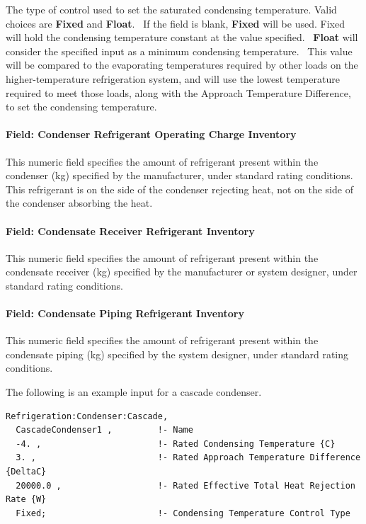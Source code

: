 The type of control used to set the saturated condensing temperature. Valid choices are \textbf{Fixed} and \textbf{Float}.~ If the field is blank, \textbf{Fixed} will be used. Fixed will hold the condensing temperature constant at the value specified.~ \textbf{Float} will consider the specified input as a minimum condensing temperature.~ This value will be compared to the evaporating temperatures required by other loads on the higher-temperature refrigeration system, and will use the lowest temperature required to meet those loads, along with the Approach Temperature Difference, to set the condensing temperature.

\paragraph{Field: Condenser Refrigerant Operating Charge Inventory}\label{field-condenser-refrigerant-operating-charge-inventory-3}

This numeric field specifies the amount of refrigerant present within the condenser (kg) specified by the manufacturer, under standard rating conditions. This refrigerant is on the side of the condenser rejecting heat, not on the side of the condenser absorbing the heat.

\paragraph{Field: Condensate Receiver Refrigerant Inventory}\label{field-condensate-receiver-refrigerant-inventory-3}

This numeric field specifies the amount of refrigerant present within the condensate receiver (kg) specified by the manufacturer or system designer, under standard rating conditions.

\paragraph{Field: Condensate Piping Refrigerant Inventory}\label{field-condensate-piping-refrigerant-inventory-3}

This numeric field specifies the amount of refrigerant present within the condensate piping (kg) specified by the system designer, under standard rating conditions.

The following is an example input for a cascade condenser.

\begin{lstlisting}
Refrigeration:Condenser:Cascade,
  CascadeCondenser1 ,         !- Name
  -4. ,                       !- Rated Condensing Temperature {C}
  3. ,                        !- Rated Approach Temperature Difference {DeltaC}
  20000.0 ,                   !- Rated Effective Total Heat Rejection Rate {W}
  Fixed;                      !- Condensing Temperature Control Type
\end{lstlisting}

